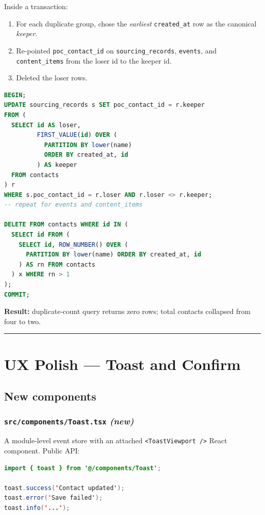 \documentclass[11pt,a4paper]{article}
\begin{document}
Inside a transaction:

\begin{enumerate}[leftmargin=*]
  \item For each duplicate group, chose the \emph{earliest}
        \texttt{created\_at} row as the canonical \emph{keeper}.
  \item Re-pointed \texttt{poc\_contact\_id} on
        \texttt{sourcing\_records}, \texttt{events}, and
        \texttt{content\_items} from the loser id to the keeper id.
  \item Deleted the loser rows.
\end{enumerate}

\begin{lstlisting}[language=SQL]
BEGIN;
UPDATE sourcing_records s SET poc_contact_id = r.keeper
FROM (
  SELECT id AS loser,
         FIRST_VALUE(id) OVER (
           PARTITION BY lower(name)
           ORDER BY created_at, id
         ) AS keeper
  FROM contacts
) r
WHERE s.poc_contact_id = r.loser AND r.loser <> r.keeper;
-- repeat for events and content_items

DELETE FROM contacts WHERE id IN (
  SELECT id FROM (
    SELECT id, ROW_NUMBER() OVER (
      PARTITION BY lower(name) ORDER BY created_at, id
    ) AS rn FROM contacts
  ) x WHERE rn > 1
);
COMMIT;
\end{lstlisting}

\textbf{Result:} duplicate-count query returns zero rows; total contacts
collapsed from four to two.

\hrule
\bigskip

\section{UX Polish --- Toast and Confirm}

\subsection{New components}

\subsubsection*{\texttt{src/components/Toast.tsx} \textit{(new)}}

A module-level event store with an attached \texttt{<ToastViewport />}
React component. Public API:

\begin{lstlisting}[language=Java]
import { toast } from '@/components/Toast';

toast.success('Contact updated');
toast.error('Save failed');
toast.info('...');
\end{lstlisting}
\end{document}
